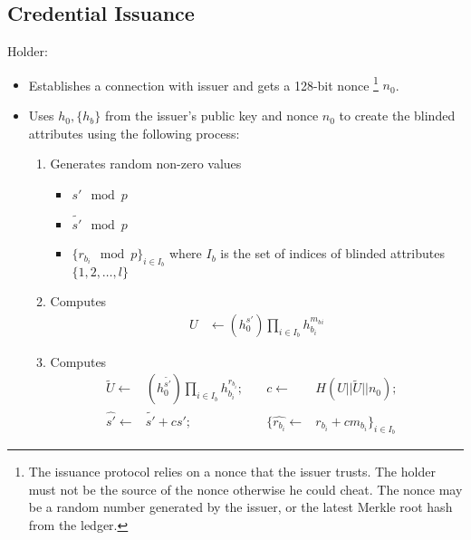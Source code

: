 \documentclass[a4paper]{article}
\begin{document}
\subsection{Credential Issuance}
Holder:
\begin{itemize}
    \item Establishes a connection with issuer and gets a 128-bit nonce \footnote{The issuance protocol relies on a nonce that the issuer trusts. The holder must not be the source of the nonce otherwise he could cheat. The nonce may be a random number generated by the issuer, or the latest Merkle root hash from the ledger.} $n_0$.
    \item Uses $h_0, \{h_b\}$ from the issuer's public key and nonce $n_0$ to create the blinded attributes using the following process:
    \begin{enumerate}
        \item Generates random non-zero values
        \begin{itemize}
            \item $s' \mod p$
            \item $\widetilde{s'} \mod p$
            \item $\{r_{b_i} \mod p\}_{i \in I_b}$ where $I_b$ is the set of indices of blinded attributes $\{1,2,\ldots,l\}$
        \end{itemize}
        \item Computes
        \begin{align}
        U&\leftarrow (h_0^{s'}) \prod_{i \in I_b}{h_{b_i}^{m_b{_i}}}
        \end{align}
        \item Computes
        \begin{align}
        \widetilde{U}\leftarrow& (h_0^{\widetilde{s'}}) \prod_{i \in I_b}{h_{b_i}^{r_{b_i}}};&\quad c\leftarrow& H(U||\widetilde{U}||n_0);&\\
        \widehat{s'}\leftarrow&\widetilde{s'} + c s';&\quad \{\widehat{r_{b_i}}\leftarrow&r_{b_i} + c m_{b_i}\}_{i \in I_b}
        \end{align}
    \end{enumerate}
\end{itemize}
\end{document}

